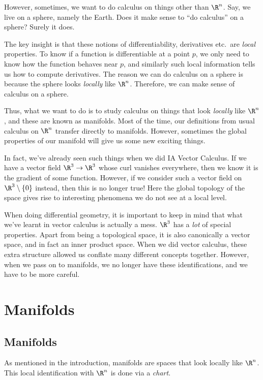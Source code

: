 \documentclass[a4paper]{article}
\begin{document}
However, sometimes, we want to do calculus on things other than $\R^n$. Say, we live on a sphere, namely the Earth. Does it make sense to ``do calculus'' on a sphere? Surely it does.

The key insight is that these notions of differentiability, derivatives etc.\ are \emph{local} properties. To know if a function is differentiable at a point $p$, we only need to know how the function behaves near $p$, and similarly such local information tells us how to compute derivatives. The reason we can do calculus on a sphere is because the sphere looks \emph{locally} like $\R^n$. Therefore, we can make sense of calculus on a sphere.

Thus, what we want to do is to study calculus on things that look \emph{locally} like $\R^n$, and these are known as manifolds. Most of the time, our definitions from usual calculus on $\R^n$ transfer directly to manifolds. However, sometimes the global properties of our manifold will give us some new exciting things.

In fact, we've already seen such things when we did IA Vector Calculus. If we have a vector field $\R^3 \to \R^3$ whose curl vanishes everywhere, then we know it is the gradient of some function. However, if we consider such a vector field on $\R^3 \setminus \{0\}$ instead, then this is no longer true! Here the global topology of the space gives rise to interesting phenomena we do not see at a local level.

When doing differential geometry, it is important to keep in mind that what we've learnt in vector calculus is actually a mess. $\R^3$ has a \emph{lot} of special properties. Apart from being a topological space, it is also canonically a vector space, and in fact an inner product space. When we did vector calculus, these extra structure allowed us conflate many different concepts together. However, when we pass on to manifolds, we no longer have these identifications, and we have to be more careful.

\section{Manifolds}
\subsection{Manifolds}
As mentioned in the introduction, manifolds are spaces that look locally like $\R^n$. This local identification with $\R^n$ is done via a \emph{chart}.
\end{document}
